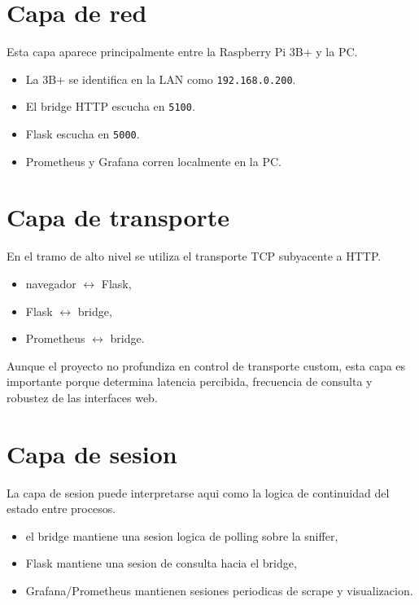 \documentclass[12pt,a4paper]{report}
\begin{document}
\section{Capa de red}

Esta capa aparece principalmente entre la Raspberry Pi 3B+ y la PC.

\begin{itemize}
    \item La 3B+ se identifica en la LAN como \texttt{192.168.0.200}.
    \item El bridge HTTP escucha en \texttt{5100}.
    \item Flask escucha en \texttt{5000}.
    \item Prometheus y Grafana corren localmente en la PC.
\end{itemize}

\section{Capa de transporte}

En el tramo de alto nivel se utiliza el transporte TCP subyacente a HTTP.

\begin{itemize}
    \item navegador $\leftrightarrow$ Flask,
    \item Flask $\leftrightarrow$ bridge,
    \item Prometheus $\leftrightarrow$ bridge.
\end{itemize}

Aunque el proyecto no profundiza en control de transporte custom, esta capa es importante porque determina latencia percibida, frecuencia de consulta y robustez de las interfaces web.

\section{Capa de sesion}

La capa de sesion puede interpretarse aqui como la logica de continuidad del estado entre procesos.

\begin{itemize}
    \item el bridge mantiene una sesion logica de polling sobre la sniffer,
    \item Flask mantiene una sesion de consulta hacia el bridge,
    \item Grafana/Prometheus mantienen sesiones periodicas de scrape y visualizacion.
\end{itemize}
\end{document}

